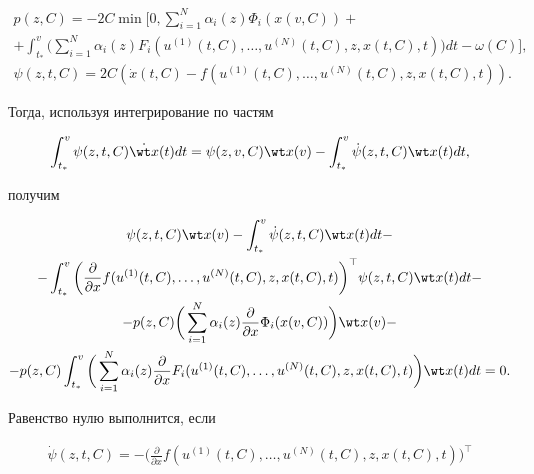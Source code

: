 \begin{pf}
\begin{gather*}
p(z,C)=-2C\min\bigg[0,\sum^N_{i=1}\alpha_i(z)\Phi_i(x(v,C))+\\ 


+\int^v_{t_*}\bigg(\sum^N_{i=1}\alpha_i(z)F_i 


(u^{(1)}(t,C),\dotsc,u^{(N)}(t,C),z,x(t,C),t)\bigg) 


dt-\omega(C)\bigg],\\ 


\psi(z,t,C)=2C(\Dot x(t,C)-f 


(u^{(1)}(t,C),\dotsc,u^{(N)}(t,C),z,x(t,C),t)). 


\end{gather*} 


Тогда, используя интегрирование по частям 


$$ 


\int^v_{t_*}\psi(z,t,C)\Dot{\wt x}(t)dt=\psi(z,v,C) 


\wt x(v)-\int^v_{t_*}\Dot\psi(z,t,C)\wt x(t)dt, 


$$ 


получим 


\begin{gather*} 


\psi(z,t,C)\wt x(v)-\int^v_{t_*}\Dot \psi(z,t,C)\wt x(t)dt-\\ 


-\int^v_{t_*}\bigg(\frac{\partial}{\partial x}f 


(u^{(1)}(t,C),\dotsc,u^{(N)}(t,C),z,x(t,C),t)\bigg)^\top 


\psi(z,t,C)\wt x(t)dt- \\ 


-p(z,C)\bigg(\sum^N_{i=1}\alpha_i(z)\frac{\partial}{\partial x} 


\Phi_i(x(v,C))\bigg)\wt x(v)- \\ 


-p(z,C)\int^v_{t_*}\bigg(\sum^N_{i=1}\alpha_i(z) 


\frac{\partial}{\partial x}F_i 


(u^{(1)}(t,C),\dotsc,u^{(N)}(t,C),z,x(t,C),t)\bigg) 


\wt x(t)dt=0. 


\end{gather*} 


Равенство нулю выполнится, если 


\begin{gather} 


\Dot\psi(z,t,C)=-\bigg(\frac{\partial}{\partial x}f 


(u^{(1)}(t,C),\dotsc,u^{(N)}(t,C),z,x(t,C),t)\bigg)^\top 



\end{gather}
\end{pf}
